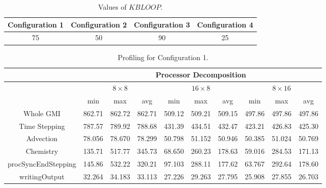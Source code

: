 \begin{table}[!h]
\begin{center}
\begin{tabular}{|c|c|c|c|} \hline\hline
Configuration 1 & Configuration 2 & Configuration 3 & Configuration 4 \\ \hline\hline
75   &   50           &   90           &   25           \\ \hline\hline
\end{tabular}
\caption{Values of $KBLOOP$.}
\label{tab:config}
\end{center}
\end{table}


\begin{table}[!h]
\begin{center}
\begin{tabular}{||c||c|c|c||c|c|c||c|c|c||} \hline\hline
 & \multicolumn{9}{|c|}{\bf Processor Decomposition} \\ \hline
 & \multicolumn{3}{|c|}{$8 \times 8$} & \multicolumn{3}{|c|}{$16 \times 8$} & \multicolumn{3}{|c|}{$8 \times 16$} \\ \hline & min & max & avg & min & max & avg & min & max & avg \\ \hline\hline
Whole GMI           &862.71&862.72&862.71&509.12&509.21&509.15&497.86&497.86&497.86\\
Time Stepping       &787.57&789.92&788.68&431.39&434.51&432.47&423.21&426.83&425.30\\
Advection           &78.056&78.670&78.299&50.798&51.152&50.946&50.385&51.024&50.769\\
Chemistry           &135.71&517.77&345.73&68.650&260.23&178.63&59.016&284.53&171.13\\
procSyncEndStepping &145.86&532.22&320.21&97.103&288.11&177.62&63.767&292.64&178.60 \\
writingOutput       &32.264&34.183&33.113&27.226&29.263&27.795&25.908&27.855&26.703\\ \hline\hline
\end{tabular}   
\caption{Profiling for Configuration 1.}
\label{tab:wretime1}
\end{center}
\end{table}


